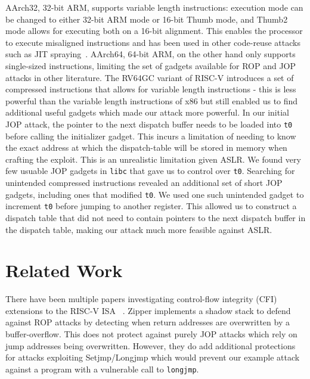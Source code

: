 AArch32, 32-bit ARM, supports variable length instructions: execution mode can be changed
to either 32-bit ARM mode or 16-bit Thumb mode, and Thumb2 mode allows for executing
both on a 16-bit alignment. This enables the processor to execute misaligned
instructions and has been used in other code-reuse attacks such as JIT spraying~\cite{shacham15lejit}.
AArch64, 64-bit ARM, on the other hand only supports single-sized instructions,
limiting the set of gadgets available for ROP and JOP attacks in other literature. 
The RV64GC variant of RISC-V introduces a set of compressed instructions that
allows for variable length instructions - this is less powerful than the
variable length instructions of x86 but still enabled us to find additional useful
gadgets which made our attack more powerful. In our initial JOP attack, the pointer
to the next dispatch buffer needs to be loaded into \verb|t0| before calling the
initializer gadget. This incurs a limitation of needing to know the exact
address at which the dispatch-table will be stored in memory when crafting the exploit.
This is an unrealistic limitation given ASLR. We found very few usuable JOP gadgets in
\verb|libc| that gave us to control over \verb|t0|. Searching for unintended
compressed instructions revealed an additional set of short JOP gadgets, including ones
that modified \verb|t0|. We used one such unintended gadget to increment \verb|t0|
before jumping to another register. This allowed us to construct a dispatch table that
did not need to contain pointers to the next dispatch buffer in the dispatch table,
making our attack much more feasible against ASLR.

\section{Related Work}
There have been multiple papers investigating control-flow integrity (CFI) 
extensions to the RISC-V ISA ~\cite{zipper,fixer}. Zipper \cite{zipper}
implements a shadow stack to defend against ROP attacks by detecting when return
addresses are overwritten by a buffer-overflow. This does not protect against
purely JOP attacks which rely on jump addresses being overwritten. However, they
do add additional protections for attacks exploiting Setjmp/Longjmp which would
prevent our example attack against a program with a vulnerable call to 
\verb|longjmp|.

